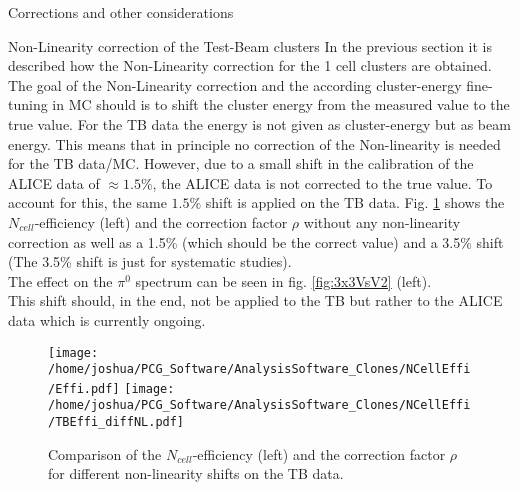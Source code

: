 \documentclass[ALICE]{ALICE_analysis_notes}
\newcommand{\PZ}{$\pi^0$\xspace}
\begin{document}
\begin{section}{Corrections and other considerations}
\begin{subsection}{Non-Linearity correction of the Test-Beam clusters}
	\label{sec:TBNL}
In the previous section it is described how the Non-Linearity correction for the 1 cell clusters are obtained. The goal of the Non-Linearity correction and the according cluster-energy fine-tuning in MC should is to shift the cluster energy from the measured value to the true value. For the TB data the energy is not given as cluster-energy but as beam energy. This means that in principle no correction of the Non-linearity is needed for the TB data/MC. However, due to a small shift in the calibration of the ALICE data of $\approx 1.5\%$, the ALICE data is not corrected to the true value. To account for this, the same $1.5\%$ shift is applied on the TB data. Fig. \ref{fig:NonLinTB} shows the $N_{cell}$-efficiency (left) and the correction factor $\rho$ without any non-linearity correction as well as a 1.5\% (which should be the correct value) and a 3.5\% shift (The 3.5\% shift is just for systematic studies).\\
The effect on the \PZ spectrum can be seen in fig. \ref{fig:3x3VsV2} (left). \\
This shift should, in the end, not be applied to the TB but rather to the ALICE data which is currently ongoing.
\begin{figure}[ht!]
	\centering
	\texttt{[image: /home/joshua/PCG\_Software/AnalysisSoftware\_Clones/NCellEffi/Effi.pdf]}
	\texttt{[image: /home/joshua/PCG\_Software/AnalysisSoftware\_Clones/NCellEffi/TBEffi\_diffNL.pdf]}
	\caption{ Comparison of the $N_{cell}$-efficiency (left) and the correction factor $\rho$ for different non-linearity shifts on the TB data. }
	\label{fig:NonLinTB}
\end{figure}
\end{subsection}


\end{section}
\end{document}
